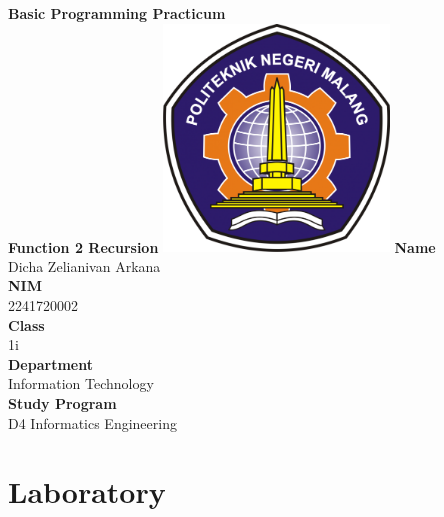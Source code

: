\documentclass[12pt,titlepage]{article}
\newcommand{\vSubject}{Basic Programming Practicum}
\newcommand{\vSubtitle}{Function 2 Recursion}
\newcommand{\vName}{Dicha Zelianivan Arkana}
\newcommand{\vNIM}{2241720002}
\newcommand{\vClass}{1i}
\newcommand{\vDepartment}{Information Technology}
\newcommand{\vStudyProgram}{D4 Informatics Engineering}
\begin{document}
\begin{titlepage}
    \centering
    \vfill
    {\bfseries\LARGE
        \vSubject\\
        \vskip0.25cm
        \vSubtitle
    }
    \vfill
    \includegraphics[width=6cm]{images/polinema-logo.png}
    \vfill
    {
        \textbf{Name}\\
        \vName\\
        \vskip0.5cm
        \textbf{NIM}\\
        \vNIM\\
        \vskip0.5cm
        \textbf{Class}\\
        \vClass\\
        \vskip0.5cm
        \textbf{Department}\\
        \vDepartment\\
        \vskip0.5cm
        \textbf{Study Program}\\
        \vStudyProgram
    }
\end{titlepage}

\section{Laboratory}
\end{document}
